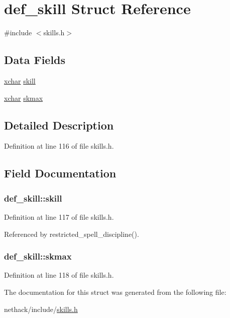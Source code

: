 \hypertarget{structdef__skill}{\section{def\+\_\+skill Struct Reference}
\label{structdef__skill}
}


{\ttfamily \#include $<$skills.\+h$>$}

\subsection*{Data Fields}
\begin{DoxyCompactItemize}
\item 
\hyperlink{global_8h_a2043b7d01ce89f4ee2fa6c345a752d32}{xchar} \hyperlink{structdef__skill_a828b2a288e0d894c696bd350aa1daf1f}{skill}
\item 
\hyperlink{global_8h_a2043b7d01ce89f4ee2fa6c345a752d32}{xchar} \hyperlink{structdef__skill_ae18e9cdedce4a8e5328236d9702353de}{skmax}
\end{DoxyCompactItemize}


\subsection{Detailed Description}


Definition at line 116 of file skills.\+h.



\subsection{Field Documentation}
\hypertarget{structdef__skill_a828b2a288e0d894c696bd350aa1daf1f}{
\subsubsection[{skill}]{ def\+\_\+skill\+::skill}}\label{structdef__skill_a828b2a288e0d894c696bd350aa1daf1f}


Definition at line 117 of file skills.\+h.



Referenced by restricted\+\_\+spell\+\_\+discipline().

\hypertarget{structdef__skill_ae18e9cdedce4a8e5328236d9702353de}{
\subsubsection[{skmax}]{ def\+\_\+skill\+::skmax}}\label{structdef__skill_ae18e9cdedce4a8e5328236d9702353de}


Definition at line 118 of file skills.\+h.



The documentation for this struct was generated from the following file\+:\begin{DoxyCompactItemize}
\item 
nethack/include/\hyperlink{skills_8h}{skills.\+h}\end{DoxyCompactItemize}
